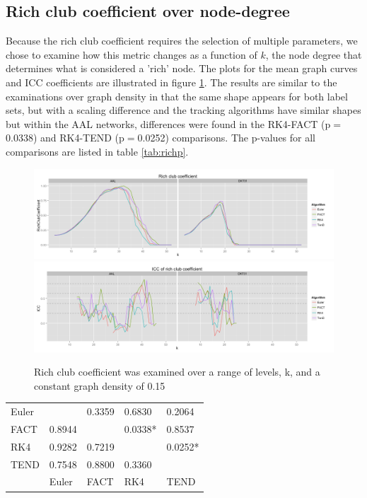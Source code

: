 \documentclass{frontiersSCNS} %
\begin{document}
\subsection{Rich club coefficient over node-degree}
Because the rich club coefficient requires the selection of multiple parameters, we chose to examine how this metric
changes as a function of $k$, the node degree that determines what is considered a 'rich' node. The plots for the
mean graph curves and ICC coefficients are illustrated in figure \ref{fig:richclub}. The results are similar to the examinations
over graph density in that the same shape appears for both label sets, but with a scaling difference and the tracking algorithms
have similar shapes but within the AAL networks, differences were found in the RK4-FACT (p$=$0.0338) and RK4-TEND (p$=$0.0252) 
comparisons. The p-values for all comparisons are listed in table \ref{tab:richp}.

\begin{figure}
\begin{center}
\includegraphics[width=0.5\linewidth]{figures/richclub_plot.png} \\
\includegraphics[width=0.5\linewidth]{figures/richclub_icc_plot.png}
\caption{Rich club coefficient was examined over a range of levels, k, and a constant graph density of 0.15}
\label{fig:richclub}
\end{center}
\end{figure}

\begin{table}[!t]
{
\begin{tabular}{l | llll }
\midrule
Euler  &            & 0.3359  & 0.6830    & 0.2064   \\
FACT & 0.8944 &              & 0.0338*  & 0.8537     \\
RK4   & 0.9282 & 0.7219   &               & 0.0252*   \\
TEND & 0.7548 & 0.8800  & 0.3360    &                \\             
\midrule
         & Euler    & FACT     & RK4        & TEND        \\
\midrule
\end{tabular}}{}
\end{table}
\end{document}
